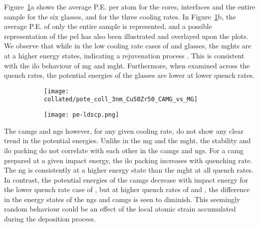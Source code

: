 \begin{changebar}
Figure~\ref{f:camg_pote}a shows the average P.E. per atom for the cores, interfaces and the entire sample for the six glasses, and for the three cooling rates. In Figure~\ref{f:camg_pote}b, the average P.E. of only the entire sample is represented, and a possible representation of the \gls{pel} has also been illustrated and overlayed upon the plots. We observe that while in the low cooling rate cases of  and  \cz glasses, the \gls{mght}s are at a higher energy states, indicating a rejuvenation process \cite{Wakeda2015,Saida2017}. This is consistent with the \gls{ilo} behaviour of \gls{mg} and \gls{mght}. Furthermore, when examined across the quench rates, the potential energies of the glasses are lower at lower quench rates. \par
\end{changebar}

\begin{figure}[!h] %
	\begin{subfigure}{\textwidth}
		\texttt{[image: collated/pote\_coll\_3nm\_Cu50Zr50\_CAMG\_vs\_MG]}
	\end{subfigure}%
	\vfill
	\begin{subfigure}{\textwidth}
		\texttt{[image: pe-ldscp.png]}
	\end{subfigure}%
	\label{f:camg_pote}
\end{figure}

The \gls{camg}s and \gls{ng}s however, for any given cooling rate, do not show any clear trend in the potential energies. Unlike in the \gls{mg} and the \gls{mght}, the stability and \gls{ilo} packing do not correlate with each other in the \gls{camg}s and \gls{ng}s. For a \gls{camg} prepared at a given impact energy, the \gls{ilo} packing increases with quenching rate. The \gls{ng} is consistently at a higher energy state than the \gls{mght} at all quench rates. In contrast, the potential energies of the \gls{camg}s decrease with impact energy for the lower quench rate case of , but at higher quench rates of  and , the difference in the energy states of the \gls{ng}s and \gls{camg}s is seen to diminish. This seemingly random behaviour could be an effect of the local atomic strain accumulated during the deposition process. \par

